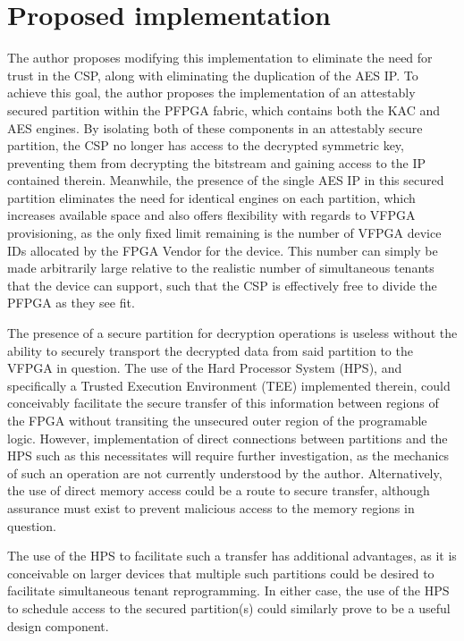 \section{Proposed implementation}\label{sec:Proposal}

The author proposes modifying this implementation to eliminate the need for trust in the CSP, along with eliminating the duplication of the AES IP. To achieve this goal, the author proposes the implementation of an attestably secured partition within the PFPGA fabric, which contains both the KAC and AES engines. By isolating both of these components in an attestably secure partition, the CSP no longer has access to the decrypted symmetric key, preventing them from decrypting the bitstream and gaining access to the IP contained therein. Meanwhile, the presence of the single AES IP in this secured partition eliminates the need for identical engines on each partition, which increases available space and also offers flexibility with regards to VFPGA provisioning, as the only fixed limit remaining is the number of VFPGA device IDs allocated by the FPGA Vendor for the device. This number can simply be made arbitrarily large relative to the realistic number of simultaneous tenants that the device can support, such that the CSP is effectively free to divide the PFPGA as they see fit.

The presence of a secure partition for decryption operations is useless without the ability to securely transport the decrypted data from said partition to the VFPGA in question. The use of the Hard Processor System (HPS), and specifically a Trusted Execution Environment (TEE) implemented therein, could conceivably facilitate the secure transfer of this information between regions of the FPGA without transiting the unsecured outer region of the programable logic. However, implementation of direct connections between partitions and the HPS such as this necessitates will require further investigation, as the mechanics of such an operation are not currently understood by the author. Alternatively, the use of direct memory access could be a route to secure transfer, although assurance must exist to prevent malicious access to the memory regions in question.

The use of the HPS to facilitate such a transfer has additional advantages, as it is conceivable on larger devices that multiple such partitions could be desired to facilitate simultaneous tenant reprogramming. In either case, the use of the HPS to schedule access to the secured partition(s) could similarly prove to be a useful design component.

